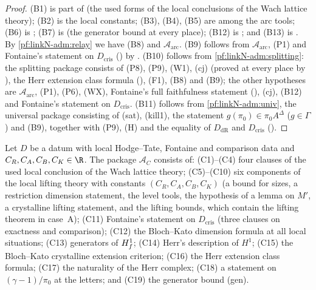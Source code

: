 \begin{proof}
(B1) is part of  (the used forms of the local conclusions of the
Wach lattice theory); (B2) is the local constants; (B3), (B4), (B5) are among the arc tools; (B6) is
; (B7) is
 (the generator bound at every place); (B12) is
; and (B13) is
. By \cref{pf:linkN-adm:relay} we have (B8) and
$\mathcal A_{\mathrm{arc}}$. (B9) follows from $\mathcal A_{\mathrm{arc}}$, (P1) and Fontaine's statement on
$D_{\mathrm{cris}}$ () by
. (B10) follows from
\cref{pf:linkN-adm:splitting}: the splitting package consists of (P8), (P9), (W1), (cj) (proved at every place by
), the Herr extension class formula
(), (F1), (B8) and (B9); the other hypotheses are
$\mathcal A_{\mathrm{arc}}$, (P1), (P6), (WX), Fontaine's full faithfulness statement
(), (cj), (B12) and Fontaine's statement on $D_{\mathrm{cris}}$.
(B11) follows from \cref{pf:linkN-adm:univ}, the universal package consisting of (sat), (kill1), the statement $g(\pi_0)\in\pi_0A^\Delta$ ($g\in\Gamma$)
and (B9), together with (P9), (H) and the equality of $D_{\mathrm{dR}}$ and $D_{\mathrm{cris}}$
().
\end{proof}

\begin{definition}\label{pf:linkN-adm:def-AC}
Let $D$ be a datum with local Hodge--Tate, Fontaine and comparison data and $C_R,C_A,C_B,C_K\in\R$. The package $\mathcal A_C$
consists of: (C1)--(C4) four clauses of the used local conclusion of the Wach lattice theory; (C5)--(C10) six components of
the local lifting theory with constants $(C_R,C_A,C_B,C_K)$ (a bound for sizes, a restriction dimension statement, the level
tools, the hypothesis of a lemma on $M'$, a crystalline lifting statement, and the lifting bounds, which contain the lifting
theorem in case~A); (C11) Fontaine's statement on $D_{\mathrm{cris}}$ (three clauses on exactness and comparison); (C12) the
Bloch--Kato dimension formula at all local situations; (C13) generators of $H^1_{f}$; (C14) Herr's description of $H^1$;
(C15) the Bloch--Kato crystalline extension criterion; (C16) the Herr extension class formula; (C17) the naturality of the
Herr complex; (C18) a statement on $(\gamma-1)/\pi_0$ at the letters; and (C19) the generator bound (gen).
\end{definition}

